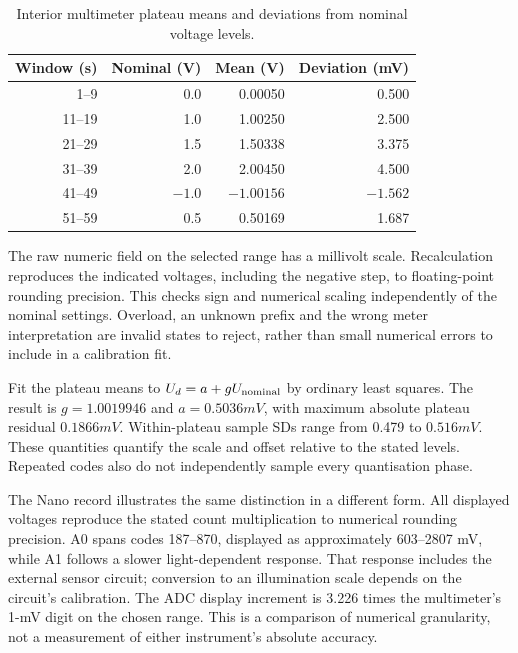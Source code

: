 \begin{table}[t]
\caption{Interior multimeter plateau means and deviations from nominal voltage levels.}
\label{tab:analog-inputs-staircase}
\centering\small
\begin{tabular}{@{}rrrr@{}}
\toprule
Window (s) & Nominal (V) & Mean (V) & Deviation (mV)\\
\midrule
1--9 & 0.0 & 0.00050 & 0.500\\
11--19 & 1.0 & 1.00250 & 2.500\\
21--29 & 1.5 & 1.50338 & 3.375\\
31--39 & 2.0 & 2.00450 & 4.500\\
41--49 & $-1.0$ & $-1.00156$ & $-1.562$\\
51--59 & 0.5 & 0.50169 & 1.687\\
\bottomrule
\end{tabular}
\end{table}

The raw numeric field on the selected range has a millivolt scale. Recalculation reproduces the indicated voltages, including the negative step, to floating-point rounding precision. This checks sign and numerical scaling independently of the nominal settings. Overload, an unknown prefix and the wrong meter interpretation are invalid states to reject, rather than small numerical errors to include in a calibration fit.

Fit the plateau means to $U_d=a+gU_{\rm nominal}$ by ordinary least squares. The result is $g=1.0019946$ and $a=0.5036\unit{mV}$, with maximum absolute plateau residual $0.1866\unit{mV}$. Within-plateau sample SDs range from 0.479 to $0.516\unit{mV}$. These quantities quantify the scale and offset relative to the stated levels. Repeated codes also do not independently sample every quantisation phase.

The Nano record illustrates the same distinction in a different form. All displayed voltages reproduce the stated count multiplication to numerical rounding precision. A0 spans codes 187--870, displayed as approximately 603--2807 mV, while A1 follows a slower light-dependent response. That response includes the external sensor circuit; conversion to an illumination scale depends on the circuit's calibration. The ADC display increment is 3.226 times the multimeter's 1-mV digit on the chosen range. This is a comparison of numerical granularity, not a measurement of either instrument's absolute accuracy.

